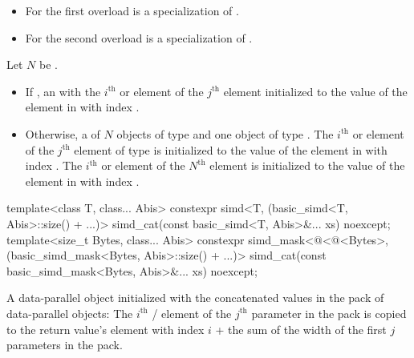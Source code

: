\begin{itemdescr}

  \pnum\constraints
  \begin{itemize}
    \item For the first overload  is a specialization of .
    \item For the second overload  is a specialization of .
  \end{itemize}

  \pnum Let $N$ be .

    \pnum\returns
    \begin{itemize}
      \item If , an  with
        the $i^\text{th}$ \simd or \mask element of the $j^\text{th}$ 
        element initialized to the value of the element in  with index
        .

      \item Otherwise, a  of $N$ objects of type  and one
        object of type .
        The $i^\text{th}$ \simd or \mask element of the $j^\text{th}$
         element of type  is initialized to the value of
        the element in  with index .
        The $i^\text{th}$ \simd or \mask element of the $N^\text{th}$
         element is initialized to the value of the element in
         with index .
    \end{itemize}
  \end{itemdescr}

\begin{itemdecl}
template<class T, class... Abis>
  constexpr simd<T, (basic_simd<T, Abis>::size() + ...)>
    simd_cat(const basic_simd<T, Abis>&... xs) noexcept;
template<size_t Bytes, class... Abis>
  constexpr simd_mask<@\deducet@<@\integerfrom@<Bytes>, (basic_simd_mask<Bytes, Abis>::size() + ...)>
    simd_cat(const basic_simd_mask<Bytes, Abis>&... xs) noexcept;

\end{itemdecl}

\begin{itemdescr}
  \pnum\returns
  A data-parallel object initialized with the concatenated values in the  pack of
  data-parallel objects: The $i^\text{th}$ / element of the
  $j^\text{th}$ parameter in the  pack is copied to the return value's element with index
  $i$ + the sum of the width of the first $j$ parameters in the  pack.
\end{itemdescr}

